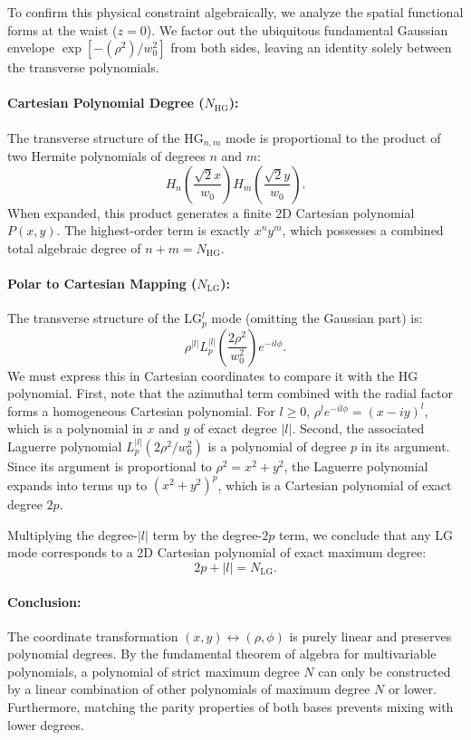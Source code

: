 \begin{resolucao}[Solution]
        To confirm this physical constraint algebraically, we analyze the spatial functional forms at the waist ($z=0$). We factor out the ubiquitous fundamental Gaussian envelope $\exp[-(\rho^2)/w_0^2]$ from both sides, leaving an identity solely between the transverse polynomials.
    
        \paragraph*{Cartesian Polynomial Degree ($N_{\text{HG}}$):}
        The transverse structure of the HG$_{n,m}$ mode is proportional to the product of two Hermite polynomials of degrees $n$ and $m$:
        \[
        H_n\left(\frac{\sqrt{2}x}{w_0}\right) H_m\left(\frac{\sqrt{2}y}{w_0}\right).
        \]
        When expanded, this product generates a finite 2D Cartesian polynomial $P(x,y)$. The highest-order term is exactly $x^n y^m$, which possesses a combined total algebraic degree of $n + m = N_{\text{HG}}$.
    
        \paragraph*{Polar to Cartesian Mapping ($N_{\text{LG}}$):}
        The transverse structure of the LG$_{p}^{l}$ mode (omitting the Gaussian part) is:
        \[
        \rho^{|l|} L_p^{|l|}\left(\frac{2\rho^2}{w_0^2}\right) e^{-i l \phi}.
        \]
        We must express this in Cartesian coordinates to compare it with the HG polynomial. 
        First, note that the azimuthal term combined with the radial factor forms a homogeneous Cartesian polynomial. For $l \ge 0$, $\rho^l e^{-il\phi} = (x - iy)^l$, which is a polynomial in $x$ and $y$ of exact degree $|l|$. 
        Second, the associated Laguerre polynomial $L_p^{|l|}(2\rho^2/w_0^2)$ is a polynomial of degree $p$ in its argument. Since its argument is proportional to $\rho^2 = x^2 + y^2$, the Laguerre polynomial expands into terms up to $(x^2+y^2)^p$, which is a Cartesian polynomial of exact degree $2p$.
        
        Multiplying the degree-$|l|$ term by the degree-$2p$ term, we conclude that any LG mode corresponds to a 2D Cartesian polynomial of exact maximum degree:
        \[
        2p + |l| = N_{\text{LG}}.
        \]

    \paragraph*{Conclusion:}
    The coordinate transformation $(x,y) \leftrightarrow (\rho,\phi)$ is purely linear and preserves polynomial degrees. By the fundamental theorem of algebra for multivariable polynomials, a polynomial of strict maximum degree $N$ can only be constructed by a linear combination of other polynomials of maximum degree $N$ or lower. Furthermore, matching the parity properties of both bases prevents mixing with lower degrees. 
    

\end{resolucao}
